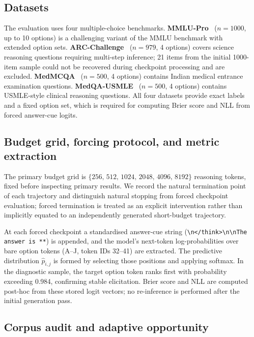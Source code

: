\documentclass[a4paper,fleqn]{cas-sc}
\theoremstyle{plain}
\theoremstyle{definition}
\theoremstyle{remark}
\begin{document}
\subsection{Datasets}

The evaluation uses four multiple-choice benchmarks.
\textbf{MMLU-Pro}~\cite{wang2024mmlu} ($n=1000$, up to 10 options) is a
challenging variant of the MMLU benchmark with extended option sets.
\textbf{ARC-Challenge}~\cite{clark2018arc} ($n=979$, 4 options) covers science
reasoning questions requiring multi-step inference; 21 items from the initial
1000-item sample could not be recovered during checkpoint processing and are excluded.
\textbf{MedMCQA}~\cite{pal2022medmcqa} ($n=500$, 4 options) contains Indian
medical entrance examination questions.
\textbf{MedQA-USMLE}~\cite{jin2021medqa} ($n=500$, 4 options) contains
USMLE-style clinical reasoning questions.
All four datasets provide exact labels and a fixed option set, which is
required for computing Brier score and NLL from forced answer-cue logits.

\subsection{Budget grid, forcing protocol, and metric extraction}

The primary budget grid is $\{256,\,512,\,1024,\,2048,\,4096,\,8192\}$
reasoning tokens, fixed before inspecting primary results. We record the
natural termination point of each trajectory and distinguish natural stopping
from forced checkpoint evaluation; forced termination is treated as an explicit
intervention rather than implicitly equated to an independently generated
short-budget trajectory.

At each forced checkpoint a standardised answer-cue string
(\texttt{\textbackslash n</think>\textbackslash n\textbackslash nThe answer
is **}) is appended, and the model's next-token log-probabilities over bare
option tokens (A--J, token IDs 32--41) are extracted. The predictive
distribution $\hat{p}_{i,j}$ is formed by selecting those positions and
applying softmax. In the diagnostic sample, the target option token ranks
first with probability exceeding 0.984, confirming stable elicitation.
Brier score and NLL are computed post-hoc from these stored logit vectors;
no re-inference is performed after the initial generation pass.

\subsection{Corpus audit and adaptive opportunity}
\end{document}
